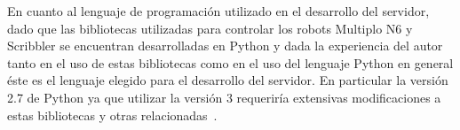 En cuanto al lenguaje de programación utilizado en el desarrollo del servidor,
dado que las bibliotecas utilizadas para controlar los robots Multiplo N6 y
Scribbler se encuentran desarrolladas en Python y dada la experiencia del autor
tanto en el uso de estas bibliotecas como en el uso del lenguaje Python en general
éste es el lenguaje elegido para el desarrollo del servidor. En particular la
versión 2.7 de Python ya que utilizar la versión 3 requeriría extensivas
modificaciones a estas bibliotecas y otras relacionadas~\cite{diveinto_666}.
